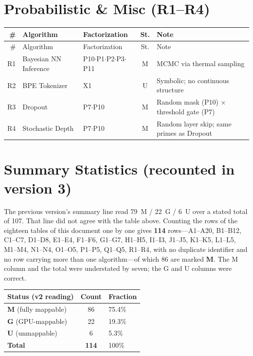 \documentclass[10pt]{article}
\begin{document}
\section{Probabilistic \& Misc (R1--R4)}

\begin{longtable}{rlp{3.0cm}cp{4.8cm}}
\toprule
\# & Algorithm & Factorization & St. & Note \\
\midrule
\endfirsthead
\toprule
\# & Algorithm & Factorization & St. & Note \\
\midrule
\endhead
\bottomrule
\endfoot
R1 & Bayesian NN Inference & P10$\cdot$P1$\cdot$P2$\cdot$P3$\cdot$P11 & M & MCMC via thermal sampling \\
R2 & BPE Tokenizer & X1 & U & Symbolic; no continuous structure \\
R3 & Dropout & P7$\cdot$P10 & M & Random mask (P10) $\times$ threshold gate (P7) \\
R4 & Stochastic Depth & P7$\cdot$P10 & M & Random layer skip; same primes as Dropout \\
\end{longtable}

\section{Summary Statistics (recounted in version 3)}

The previous version's summary line read 79~M / 22~G / 6~U over a stated total of
107. That line did not agree with the table above. Counting the rows of the
eighteen tables of this document one by one gives \textbf{114} rows---A1--A20,
B1--B12, C1--C7, D1--D8, E1--E4, F1--F6, G1--G7, H1--H5, I1--I3, J1--J5, K1--K5,
L1--L5, M1--M4, N1--N4, O1--O5, P1--P5, Q1--Q5, R1--R4, with no duplicate
identifier and no row carrying more than one algorithm---of which 86 are marked
\textbf{M}. The M column and the total were understated by seven; the G and U
columns were correct.

\begin{tabular}{lcl}
\toprule
Status (v2 reading) & Count & Fraction \\
\midrule
\textbf{M} (fully mappable) & 86 & 75.4\% \\
\textbf{G} (GPU-mappable) & 22 & 19.3\% \\
\textbf{U} (unmappable) & 6 & 5.3\% \\
\midrule
\textbf{Total} & \textbf{114} & 100\% \\
\bottomrule
\end{tabular}
\end{document}
